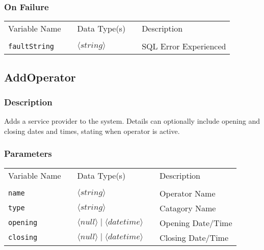 \subsubsection{On Failure}

\begin{tabular}{lllll}
Variable Name	&		&	Data Type(s)		&	&	Description	\\
				&	&	&	&	\\
\verb!faultString! & \hspace{15mm} & $\langle string\rangle $ & \hspace{15mm} & SQL Error Experienced \\
\end{tabular}


\subsection{AddOperator}

\subsubsection{Description}

Adds a service provider to the system. Details can optionally include
opening and closing dates and times, stating when operator is active.  

\subsubsection{Parameters}

\begin{tabular}{lllll}
Variable Name	&		&	Data Type(s)		&	&	Description	\\
				&	&	&	&	\\
\verb!name! & \hspace{15mm} & $\langle string\rangle $ & \hspace{15mm} & Operator Name \\
\verb!type! & \hspace{15mm} & $\langle string\rangle $ & \hspace{15mm} & Catagory Name \\
\verb!opening! & \hspace{15mm} & $\langle null\rangle  \mid \langle datetime\rangle $ & \hspace{15mm} & Opening Date/Time \\
\verb!closing! & \hspace{15mm} & $\langle null\rangle  \mid \langle datetime\rangle $ & \hspace{15mm} & Closing Date/Time \\
\end{tabular}

